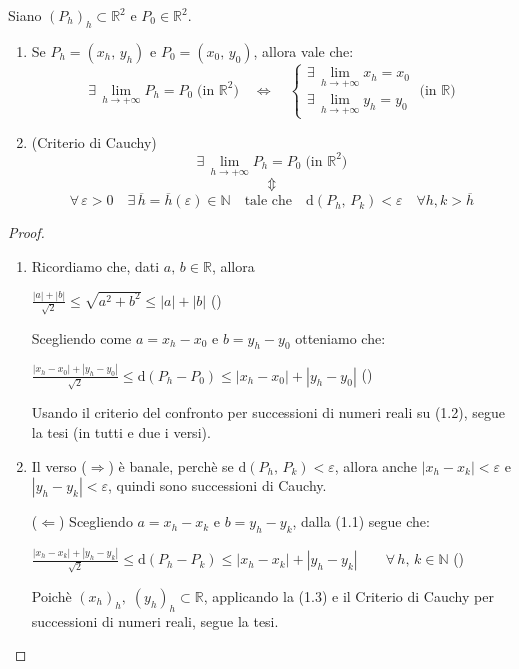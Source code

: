 \begin{thm}
Siano $(P_h)_h \subset \mathbb{R}^2$ e $P_0 \in \mathbb{R}^2$.
\begin{enumerate}[labelindent=\parindent,leftmargin=*,label=\textnormal{(\roman*)},start=1]
\item Se $P_h=(x_h,\, y_h)$ e $P_0=(x_0,\, y_0)$, allora vale che:
$$\exists \, \lim_{h \rightarrow +\infty} P_h = P_0 \; \text{(in } \mathbb{R}^2\text{)} \quad \Longleftrightarrow \quad 
\begin{cases}
\exists \, \lim_{h \rightarrow +\infty} x_h = x_0\\
\exists \, \lim_{h \rightarrow +\infty} y_h = y_0
\end{cases}
 \; \text{(in } \mathbb{R}\text{)}$$
\item (Criterio di Cauchy)
$$\exists \, \lim_{h \rightarrow +\infty} P_h = P_0 \; \text{(in } \mathbb{R}^2\text{)}$$
$$\Updownarrow$$
$$\forall \, \varepsilon > 0 \quad \exists \, \overline{h}=\overline{h}(\varepsilon) \in \mathbb{N} \quad \text{tale che} \quad \mathrm{d}(P_h,\, P_k) < \varepsilon \quad \forall h,k > \overline{h}$$
\end{enumerate}
\end{thm}
\begin{proof}
\mbox{}
\begin{enumerate}[labelindent=\parindent,leftmargin=*,label=\textnormal{(\roman*)},start=1]
\item Ricordiamo che, dati $a,\, b \in \mathbb{R}$, allora
\begin{center}
\hfill
$\displaystyle \frac{|a|+|b|}{\sqrt{2}} \leq \sqrt{a^2+b^2} \leq |a|+|b|$
\hfill{}\textnormal{(\theequation)}
\end{center}
Scegliendo come $a=x_h-x_0$ e $b=y_h-y_0$ otteniamo che:
\begin{center}
\hfill
$\displaystyle \frac{|x_h-x_0|+|y_h-y_0|}{\sqrt{2}} \leq \mathrm{d}(P_h-P_0) \leq |x_h-x_0|+|y_h-y_0|$
\hfill{}\textnormal{(\theequation)}
\end{center}

Usando il criterio del confronto per successioni di numeri reali su \textnormal{(1.2)}, segue la tesi (in tutti e due i versi).

\item Il verso \textnormal{(}$\Rightarrow$\textnormal{)} è banale, perchè se $\mathrm{d}(P_h,\, P_k) < \varepsilon$, allora anche $|x_h-x_k| < \varepsilon$ e $|y_h-y_k| < \varepsilon$, quindi sono successioni di Cauchy.

\textnormal{(}$\Leftarrow$\textnormal{)} Scegliendo $a=x_h-x_k$ e $b=y_h-y_k$, dalla \textnormal{(1.1)} segue che:
\begin{center}
\hfill
$\displaystyle \frac{|x_h-x_k|+|y_h-y_k|}{\sqrt{2}} \leq \mathrm{d}(P_h-P_k) \leq |x_h-x_k|+|y_h-y_k| \qquad \forall \, h,\, k \in \mathbb{N}$
\hfill{}\textnormal{(\theequation)}
\end{center}
Poichè $(x_h)_h,\; (y_h)_h \subset \mathbb{R}$, applicando la \textnormal{(1.3)} e il Criterio di Cauchy per successioni di numeri reali, segue la tesi.

\end{enumerate}
\end{proof}
